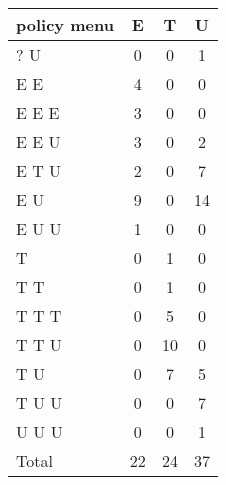 \begin{tabular}{lccc}
\hline\hline 
\addlinespace 
policy menu & E & T & U \\ 
\hline 
? U & 0 & 0 & 1 \\
E E & 4 & 0 & 0 \\
E E E & 3 & 0 & 0 \\
E E U & 3 & 0 & 2 \\
E T U & 2 & 0 & 7 \\
E U & 9 & 0 & 14 \\
E U U & 1 & 0 & 0 \\
T & 0 & 1 & 0 \\
T T & 0 & 1 & 0 \\
T T T & 0 & 5 & 0 \\
T T U & 0 & 10 & 0 \\
T U & 0 & 7 & 5 \\
T U U & 0 & 0 & 7 \\
U U U & 0 & 0 & 1 \\
\addlinespace 
Total & 22 & 24 & 37 \\
\hline 
\end{tabular}